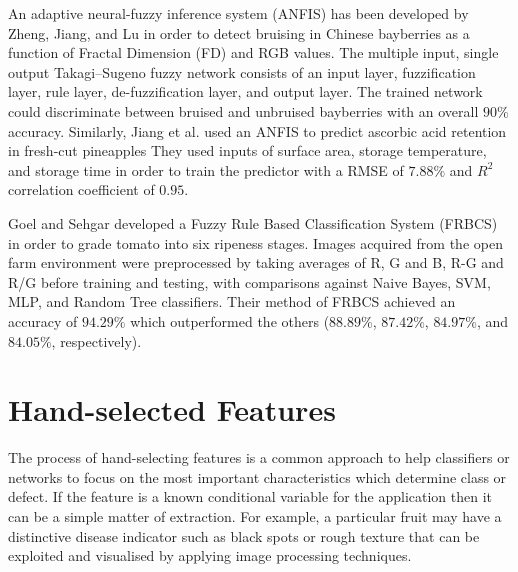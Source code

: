 \documentclass[fleqn,twoside,12pt]{report}
\begin{document}
An adaptive neural-fuzzy inference system (ANFIS) has been developed by Zheng, Jiang, and Lu \cite{zheng} in order to detect bruising in Chinese bayberries as a function of Fractal Dimension (FD) and RGB values. The multiple input, single output Takagi–Sugeno fuzzy network consists of an input layer, fuzzification layer, rule layer, de-fuzzification layer, and output layer. The trained network could discriminate between bruised and unbruised bayberries with an overall $90\%$ accuracy. Similarly, Jiang et al.\cite{jiang} used an ANFIS to predict ascorbic acid retention in fresh-cut pineapples They used inputs of surface area, storage temperature, and storage time in order to train the predictor with a RMSE of $7.88\%$ and $R^2$ correlation coefficient of $0.95$.

Goel and Sehgar \cite{goel} developed a Fuzzy Rule Based Classification System (FRBCS) in order to grade tomato into six ripeness stages. Images acquired from the open farm environment were preprocessed by taking averages of R, G and B, R-G and R/G before training and testing, with comparisons against Naive Bayes, SVM, MLP, and Random Tree classifiers. Their method of FRBCS achieved an accuracy of $94.29\%$ which outperformed the others ($88.89\%$, $87.42\%$, $84.97\%$, and $84.05\%$, respectively).  




\section{Hand-selected Features}

The process of hand-selecting features is a common approach to help classifiers or networks to focus on the most important characteristics which determine class or defect. If the feature is a known conditional variable for the application then it can be a simple matter of extraction. For example, a particular fruit may have a distinctive disease indicator such as black spots or rough texture that can be exploited and visualised by applying image processing techniques. 
\end{document}
